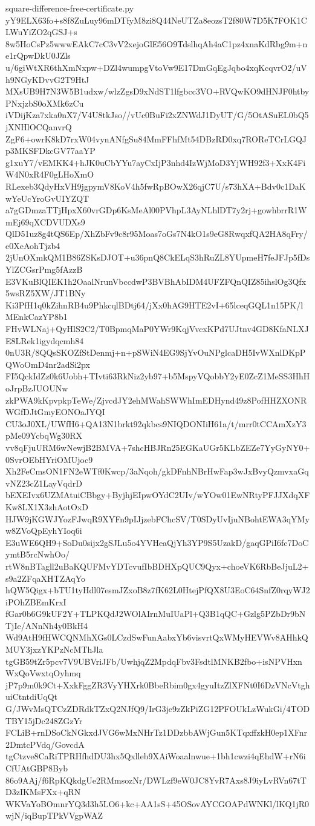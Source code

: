 \documentclass[11pt]{article}
\theoremstyle{definition}
\theoremstyle{remark}
\begin{document}
\begin{filecontents*}[overwrite]{square-difference-free-certificate.py}
yY9ELX63fo+s8f8ZuLuy96mDTfyM8zi8Q44NeUTZa8eozsT2f80W7D5K7FOK1CLWuYiZO2qGSJ+s
8w5HoCsPz5wwwEAkC7cC3vV2xejoGlE56O9TdslhqAh4aC1pz4xnaKdRbg9m+ne1rQpwDkU0JZls
u/6giWtXR6thXmNxpw+DZl4wumpgVtoVw9E17DmGqEgJqbo4xqKcqvrO2/uVh9NGyKDvvG2T9HtJ
MXsUB9H7N3W5B1udxw/wlzZgsD9xNdST1lfgbcc3VO+RVQwKO9dHNJF0htbyPNxjzbS0oXMk6zCu
iVDijKza7xka0nX7/V4U8tkJso//vUc0BuFi2xZNWdJ1DyUT/G/5OtASuEL0bQ5jXNHlOCQanvrQ
ZgF6+owrK8kD7rxW04vynANfgSu84MmFFhfMt54DBzRD0xq7ROReTCrLGQJp3MKSFDkcGV77aaYP
g1xuY7/vEMKK4+hJK0uCbYYu7ayCxIjP3nhd4IzWjMoD3YjWH92f3+XxK4FiW4N0xR4F0gLHoXmO
RLexeb3QdyHxVH9jgpymV8KoV4h5fwRpBOwX26qjC7U/s73hXA+Bdv0c1DaKwYeUcYroGvUIYZQT
a7gGDmzaTTjHpxX60vrGDp6KsMeAl00PVhpL3AyNLhlDT7y2rj+gowhbrrR1WmEj69qXCDVUDXs9
QlD51uz8g4tQS6Ep/XhZbFv9c8r95Moas7oGs7N4kO1s9eG8RwqxfQA2HA8qFry/e0XeAohTjzb4
2jUnOXmkQM1B86ZSKsDJOT+u36pnQ8CkELqS3hRuZL8YUpmeH7feJFJp5fDsYlZCGsrPmg5fAzzB
E3VKuBlQIEK1h2OaalNrunVbccdwP3BVBhAbIDM4UFZFQnQIZ85ihslOg3Qfx5wsRZ5XW/JT1BNy
Ki3PfH1q0kZihnRB4u9PhkcqlBDtj64/jXx0hAG9HTE2vI+65lceqGQL1n15PK/lMEnkCazYP8b1
FHvWLNaj+QyHlS2C2/T0BpmqMaP0YWr9KqjVvcxKPd7UJtnv4GD8KfaNLXJE8LRek1igydqcmh84
0nU3R/8QQsSKOZfStDenmj+n+pSWiN4EG9SjYvOuNPglcaDH5IvWXnlDKpPQWoOmD4nr2adSi2px
FI5QckIdZz0k6Uobh+TIvti63RkNiz2yb97+b5MspyVQobbY2yE0ZcZ1MeSS3HhHoJrpBzJUOUNw
zkPWA9kKpvpkpTeWe/ZjvcdJY2ehMWahSWWhImEDHynd49z8PofHHZXONRWGfDJtGmyEONOaJYQI
CU3oJ0XL/UWfH6+QA13N1brkt92qkbcs9NIQDONIiH61a/t/mrr0tCCAmXzY3pMe09YcbqWg30RX
vv8qFjuURM6wNewjB2BMVA+7shcHBJRn25EGKaUGr5KLbZEZe7YyGyNY0+0SvrOEbHYriOMUjoc9
Xh2FeCmsON1FN2eWTf0Kwcp/3aNqoh/gkDFnhNBrHwFap3wJxBvyQzmvxaGqvNZ23cZ1LayVqdrD
bEXEIvx6UZMAtuiCBbgy+ByjhjEIpwOYdC2UIv/wYOw01EwNRtyPFJJXdqXFKw8LX1X3zhAotOxD
HJW9jKGWJYozFJwqR9XYFn9pIJjzebFChcSV/T0SDyUvIjuNBohtEWA3qYMyw8ZVoQpEyhYIoq6i
E3uWE6QH9+SoDu0sijx2gSJLu5o4YVHeaQjYh3YP9S5UzakD/gaqGPiI6fc7DoCymtB5rcNwhOo/
rtW8nBTagll2uBaKQUFMvYDTcvufIbBDHXpQUC9Qyx+choeVK6RbBeJjuL2+s9a2ZFqaXHTZAqYo
hQW5Qigx+bTU1tyHdl07esmJZxoB8z7fK62L0HtejPfQX8U3EoC64SnfZ0rqyWJ2iPOhZBEmKrxI
fGar0b6G9kUF2Y+TLPKQdJ2WOlAIrnMuIUaPl+Q3B1qQC+Gzlg5PZbDr9bNTjIe/ANnNh4y0BkH4
Wd9AtH9fHWCQNMhXGs0LCzdSwFunAabxYb6visvrtQxWMyHEVWv8AHhkQMUY3jxzYKPzNcMThJla
tgGB59tZr5pcv7V9UBVriJFb/UwhjqZ2MpdqFbv3FsdtlMNKB2fbo+isNPVHxnWxQoVwxtqOyhmq
jP7p9m0k9Ct+XxkFggZR3VyYHXrk0BbeRbim0gx4gyuItzZlXFNt0I6DzVNcVtghuiCtntdiUqQt
G/JWvMsQTCzZDRdkTZxQ2NJfQ9/IrG3je9zZkPiZG12PFOUkLzWukGi/4TODTBY15jDc248ZGzYr
FCLiB+rnDSoCkNGkxdJVG6wMxNHrTz1DDzbbAWjGun5KTqxffzkH0ep1XFnr2DmtcPVdq/GovcdA
tgCtzve8CaRiTPRHfhdDU3hx5Qxlleb9XAiWoaalnwue+1bh1cwzi4qEhdW+rN6iCfUAtGBP8Byb
86o9AAj/f6RpKQkdgUe2RMmsozNr/DWLzf9eW0JC8YvR7Axs8J9iyLvRVn67tTD3zIKMsFXx+qRN
WKVaYoBOmnrYQ3d3h5LO6+kc+AA1sS+45OSovAYCGOAPdWNKl/lKQ1jR0wjN/iqBupTPkVVgpWAZ

\end{filecontents*}
\end{document}
